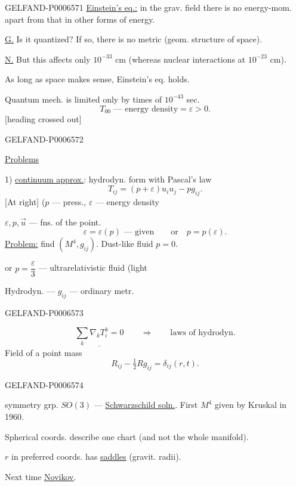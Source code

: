 \begin{GelfandAdjacentEvidence}{GELFAND-P000657}{1}
\underline{Einstein’s eq.:} in the grav. field there is no energy-mom. apart from that in other forms of energy.

\underline{\underline{G.}} Is it quantized? If so, there is no metric (geom. structure of space).

\underline{\underline{N.}} But this affects only \(10^{-33}\) cm
(whereas nuclear interactions at \(10^{-23}\) cm).

As long as space makes sense, Einstein’s eq. holds.

Quantum mech. is limited only by times of \(10^{-43}\) sec.
\[
T_{00}\text{ --- energy density}=\varepsilon>0.
\]
[heading crossed out]
\end{GelfandAdjacentEvidence}
\begin{GelfandAdjacentEvidence}{GELFAND-P000657}{2}

\underline{Problems}

1) \underline{continuum approx.}: hydrodyn. form with Pascal’s law
\[
T_{ij}=(p+\varepsilon)u_i u_j-pg_{ij}.
\]
[At right] (\(p\) --- press., \(\varepsilon\) --- energy density

\(\varepsilon,p,\vec u\) --- fns. of the point.
\[
\varepsilon=\varepsilon(p)\text{ --- given}\qquad\text{or}\quad p=p(\varepsilon).
\]
\underline{Problem:} find \((M^4,g_{ij})\).
Dust-like fluid \(p=0\).

or \(p=\dfrac{\varepsilon}{3}\) --- ultrarelativistic fluid (light

Hydrodyn. --- \(g_{ij}\) --- ordinary metr.
\end{GelfandAdjacentEvidence}
\begin{GelfandAdjacentEvidence}{GELFAND-P000657}{3}

\[
\underline{\sum_k\nabla_k T_i^k=0}\qquad\Longrightarrow\qquad
\text{laws of hydrodyn.}
\]
Field of a point mass
\[
R_{ij}-\tfrac12Rg_{ij}=\delta_{ij}(r,t).
\]
\end{GelfandAdjacentEvidence}
\begin{GelfandAdjacentEvidence}{GELFAND-P000657}{4}

symmetry grp. \(SO(3)\) --- \underline{Schwarzschild soln.}.
First \(M^4\) given by Kruskal in 1960.

Spherical coords. describe one chart (and not the whole manifold).

\(r\) in preferred coords. has \underline{saddles} (gravit. radii).

Next time \underline{\underline{Novikov}}.
\end{GelfandAdjacentEvidence}
